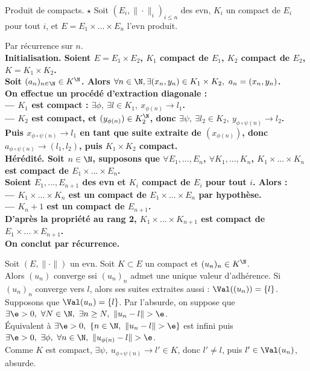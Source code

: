 \documentclass[11pt]{article}
\begin{document}
\begin{prop}{Produit de compacts. $\star$}{}
    Soit $(E_i, \|\cdot\|_i)_{i\leq n}$ des evn, $K_i$ un compact de $E_i$ pour tout $i$, et $E=E_1\times...\times E_n$ l'evn produit.
    \begin{center}
    \end{center}
    \tcblower
    Par récurrence sur $n$.\\
    \bf{Initialisation.} Soient $E=E_1\times E_2$, $K_1$ compact de $E_1$, $K_2$ compact de $E_2$, $K=K_1\times K_2$.\\
    Soit $(a_n)_{n\in\N}\in K^\N$. Alors $\forall n \in \N, \exists (x_n, y_n) \in K_1 \times K_2, ~ a_n = (x_n, y_n)$.\\
    On effectue un procédé d'extraction diagonale :\\
    --- $K_1$ est compact : $\exists \phi, ~ \exists l \in K_1, ~ x_{\phi(n)}\to l_1$.\\
    --- $K_2$ est compact, et $(y_{\phi(n)})\in K_2^\N$, donc $\exists \psi, ~ \exists l_2 \in K_2, ~ y_{\phi\circ\psi(n)}\to l_2$.\\
    Puis $x_{\phi\circ\psi(n)}\to l_1$ en tant que suite extraite de $(x_{\phi(n)})$, donc $a_{\phi\circ\psi(n)}\to(l_1,l_2)$, puis $K_1\times K_2$ compact.\\
    \bf{Hérédité.} Soit $n\in\N$, supposons que $\forall E_1,...,E_n$, $\forall K_1,...,K_n$, $K_1\times...\times K_n$ est compact de $E_1\times...\times E_n$.\\
    Soient $E_1,...,E_{n+1}$ des evn et $K_i$ compact de $E_i$ pour tout $i$. Alors :\\
    --- $K_1\times ... \times K_n$ est un compact de $E_1\times...\times E_n$ par hypothèse.\\
    --- $K_n+1$ est un compact de $E_{n+1}$.\\
    D'après la propriété au rang 2, $K_1\times...\times K_{n+1}$ est compact de $E_1\times...\times E_{n+1}$.\\
    On conclut par récurrence.
\end{prop}

\begin{prop}{}{}
    Soit $(E,\|\cdot\|)$ un evn. Soit $K\subset E$ un compact et $(u_n)_n\in K^\N$.\\
    Alors $(u_n)$ converge ssi $(u_n)_n$ admet une unique valeur d'adhérence.
    \tcblower
    \boxed{\ra} Si $(u_n)_n$ converge vers $l$, alors ses suites extraites aussi : $\Val((u_n))=\{l\}$.\\
    \boxed{\la} Supposons que $\Val(u_n)=\{l\}$. Par l'absurde, on suppose que $\exists \e > 0, ~ \forall N \in \N, ~ \exists n \geq N, ~ \|u_n - l\| > \e$.\\
    Équivalent à $\exists \e > 0, ~ \{n \in \N, ~ \|u_n - l\| > \e\}$ est infini puis $\exists\e>0, ~ \exists \phi , ~ \forall n \in \N, ~ \|u_{\phi(n)}-l\|>\e$.\\
    Comme $K$ est compact, $\exists \psi, ~ u_{\phi\circ\psi(n)}\to l' \in K$, donc $l'\neq l$, puis $l'\in \Val(u_n)$, absurde.
\end{prop}
\end{document}
